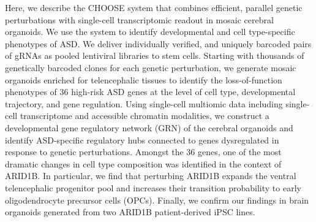 Here, we describe the CHOOSE system that combines efficient, parallel genetic perturbations with single-cell transcriptomic readout in mosaic cerebral organoids. We use the system to identify developmental and cell type-specific phenotypes of ASD. We deliver individually verified, and uniquely barcoded pairs of gRNAs as pooled lentiviral libraries to stem cells. Starting with thousands of genetically barcoded clones for each genetic perturbation, we generate mosaic organoids enriched for telencephalic tissues to identify the loss-of-function phenotypes of 36 high-risk ASD genes at the level of cell type, developmental trajectory, and gene regulation. Using single-cell multiomic data including single-cell transcriptome and accessible chromatin modalities, we construct a developmental gene regulatory network (GRN) of the cerebral organoids and identify ASD-specific regulatory hubs connected to genes dysregulated in response to genetic perturbations. Amongst the 36 genes, one of the most dramatic changes in cell type composition was identified in the context of ARID1B. In particular, we find that perturbing ARID1B expands the ventral telencephalic progenitor pool and increases their transition probability to early oligodendrocyte precursor cells (OPCs). Finally, we confirm our findings in brain organoids generated from two ARID1B patient-derived iPSC lines.

